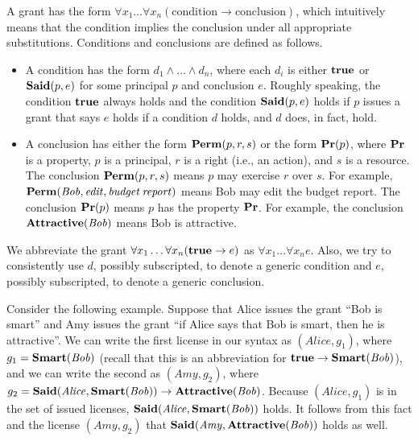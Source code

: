 \documentclass{acmtrans2m}
\newcommand{\<}{
}
\renewcommand{\>}{\rangle}
\newcommand{\Att}{\mathit{\bf Attractive}}
\newcommand{\Smart}{\mathit{\bf Smart}}
\newcommand{\Said}{\mathit{\bf Said}}
\newcommand{\true}{\mathit{\bf{true}}}
\newcommand{\Permitted}{\mathit{\bf Perm}}
\renewcommand{\Pr}{\mathit{\bf Pr}}
\newcommand{\cd}{d}
\newcommand{\cc}{e}
\newcommand{\imp}{\rightarrow}
\begin{document}
A grant has the form $\forall x_1 \ldots \forall x_n(\mbox{condition} \imp \mbox
{conclusion})$, which intuitively means that the condition implies the conclusion
under all appropriate substitutions.  Conditions and conclusions are defined as follows.
\begin{itemize}
\item A condition has the form $\cd_1\land\ldots\land\cd_n$, where each $\cd_i$ is either
$\true$ or $\Said(p, \cc)$ for some principal $p$ and conclusion $\cc$.  Roughly speaking,
the condition $\true$ always holds and the condition $\Said(p, \cc)$ holds if $p$ issues a
grant that says $\cc$ holds if a condition $\cd$ holds, and $\cd$ does, in fact, hold.
\item A conclusion has either the form $\Permitted(p, r, s)$ or the form $\Pr(p)$, where
$\Pr$ is a property, $p$ is a principal, $r$ is a right (i.e., an action), and $s$ is a
resource.  The conclusion $\Permitted(p, r, s)$ means $p$ may exercise $r$ over $s$.  For
example, $\Permitted(\mathit{Bob}, \mathit{edit}, \mathit{budget\hspace{2 pt}report})$ means
Bob may edit the budget report.  The conclusion $\Pr(p)$ means $p$ has the property $\Pr$.
For example, the conclusion $\Att(\mathit{Bob})$ means Bob is attractive.
\end{itemize}
We abbreviate the grant $\forall x_1 \ldots \forall x_n(\true\imp \cc)$ as
$\forall x_1 \ldots \forall x_n\cc$.  Also, we try to consistently use $\cd$, possibly
subscripted, to denote a generic condition and $\cc$, possibly subscripted, to denote a
generic conclusion.

\begin{sloppypar}
Consider the following example.  Suppose that Alice issues the grant ``Bob is smart''
and Amy issues the grant ``if Alice says that Bob is smart, then he is attractive''.  We
can write the first license in our syntax as $(\mathit{Alice}, g_1)$, where
$g_1 = \Smart(\mathit{Bob})$ (recall that this is an abbreviation for
$\true\imp\Smart(\mathit{Bob})$), and we can write the second as
$(\mathit{Amy}, g_2)$, where $g_2 =  \Said(\mathit{Alice}, \Smart(\mathit{Bob})) \imp
\Att(\mathit{Bob})$.  Because $(\mathit{Alice}, g_1)$ is in the set of issued licenses,
$\Said(\mathit{Alice}, \Smart(\mathit{Bob}))$ holds.  It follows from this fact and the
license $(\mathit{Amy}, g_2)$ that $\Said(\mathit{Amy}, \Att(\mathit{Bob}))$ holds as
well.
\end{sloppypar}
\end{document}
